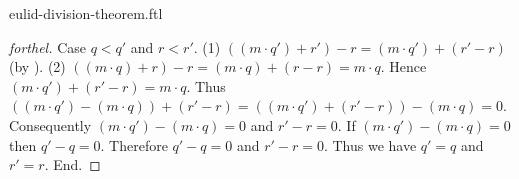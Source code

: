 \documentclass{naproche-library}
\begin{document}
\begin{smodule}{eulid-division-theorem.ftl}
\begin{proof}[forthel]
    Case $q < q'$ and $r < r'$.
      (1) $((m \cdot q') + r') - r = (m \cdot q') + (r' - r)$ (by ).
      (2) $((m \cdot q) + r) - r
        = (m \cdot q) + (r - r)
        = m \cdot q$.
      Hence $(m \cdot q') + (r' - r) = m \cdot q$.
      Thus $((m \cdot q') - (m \cdot q)) + (r' - r)
        = ((m \cdot q') + (r' - r)) - (m \cdot q)
        = 0$.
      Consequently $(m \cdot q') - (m \cdot q) = 0$ and $r' - r = 0$.
      If $(m \cdot q') - (m \cdot q) = 0$ then $q' - q = 0$.
      Therefore $q' - q = 0$ and $r' - r = 0$.
      Thus we have $q' = q$ and $r' = r$.
    End.
  \end{proof}
\end{smodule}
\end{document}
